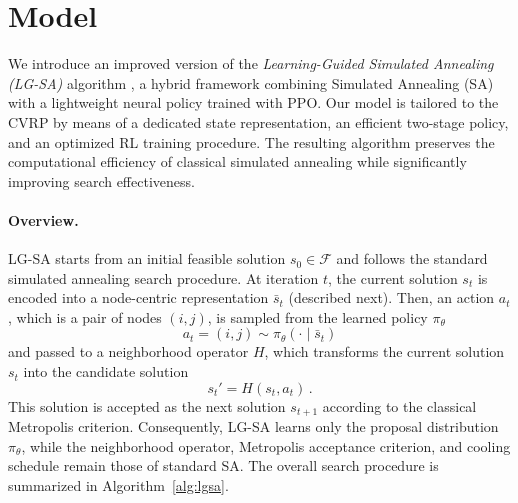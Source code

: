 \documentclass[letterpaper]{article} %
\begin{document}
\section{Model}








\renewcommand{\vec}[1]{\mathbf{#1}}

We introduce an improved version of the \emph{Learning-Guided Simulated Annealing (LG-SA)} algorithm \cite{AndrettiEtAl26,correia_neural_2023}, a hybrid framework combining Simulated Annealing (SA) with a lightweight neural policy trained with PPO. Our model is tailored to the CVRP by means of a dedicated state representation, an efficient two-stage policy, and an optimized RL training procedure. The resulting algorithm preserves the computational efficiency of classical simulated annealing while significantly improving search effectiveness.

\paragraph{Overview.}
LG-SA starts from an initial feasible solution $s_0 \in \mathcal{F}$ and follows the standard simulated annealing search procedure. At iteration $t$, the current solution $s_t$ is encoded into a node-centric representation $\bar s_t$ (described next). Then, an action $a_t$, which is a pair of nodes $(i,j)$, is sampled from the learned policy $\pi_\theta$
$$
a_t = (i,j) \sim \pi_\theta(\cdot\mid \bar s_t)
$$
and passed to a neighborhood operator $H$, which transforms the current solution $s_t$ into the candidate solution
$$
s_t' = H(s_t, a_t) \,.
$$
This solution is accepted as the next solution $s_{t+1}$ according to the classical Metropolis criterion. Consequently, LG-SA learns only the proposal distribution $\pi_\theta$, while the neighborhood operator, Metropolis acceptance criterion, and cooling schedule remain those of standard SA. The overall search procedure is summarized in Algorithm~\ref{alg:lgsa}.
\end{document}
